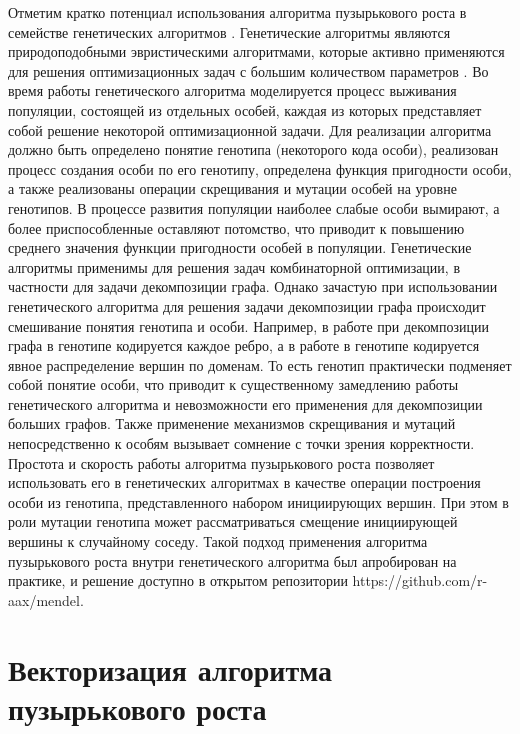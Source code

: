 \documentclass[
11pt,%
tightenlines,%
twoside,%
onecolumn,%
nofloats,%
nobibnotes,%
nofootinbib,%
superscriptaddress,%
noshowpacs,%
centertags]%
{revtex4}
\begin{document}
Отметим кратко потенциал использования алгоритма пузырькового роста в семействе генетических алгоритмов \cite{20Katosh}.
Генетические алгоритмы являются природоподобными эвристическими алгоритмами, которые активно применяются для решения оптимизационных задач с большим количеством параметров \cite{21Wirayanti}.
Во время работы генетического алгоритма моделируется процесс выживания популяции, состоящей из отдельных особей, каждая из которых представляет собой решение некоторой оптимизационной задачи.
Для реализации алгоритма должно быть определено понятие генотипа (некоторого кода особи), реализован процесс создания особи по его генотипу, определена функция пригодности особи, а также реализованы операции скрещивания и мутации особей на уровне генотипов.
В процессе развития популяции наиболее слабые особи вымирают, а более приспособленные оставляют потомство, что приводит к повышению среднего значения функции пригодности особей в популяции.
Генетические алгоритмы применимы для решения задач комбинаторной оптимизации, в частности для задачи декомпозиции графа.
Однако зачастую при использовании генетического алгоритма для решения задачи декомпозиции графа происходит смешивание понятия генотипа и особи.
Например, в работе \cite{22Chaouche} при декомпозиции графа в генотипе кодируется каждое ребро, а в работе \cite{23Li} в генотипе кодируется явное распределение вершин по доменам.
То есть генотип практически подменяет собой понятие особи, что приводит к существенному замедлению работы генетического алгоритма и невозможности его применения для декомпозиции больших графов.
Также применение механизмов скрещивания и мутаций непосредственно к особям вызывает сомнение с точки зрения корректности.
Простота и скорость работы алгоритма пузырькового роста позволяет использовать его в генетических алгоритмах в качестве операции построения особи из генотипа, представленного набором инициирующих вершин.
При этом в роли мутации генотипа может рассматриваться смещение инициирующей вершины к случайному соседу.
Такой подход применения алгоритма пузырькового роста внутри генетического алгоритма был апробирован на практике, и решение доступно в открытом репозитории https://github.com/r-aax/mendel.

\section{Векторизация алгоритма пузырькового роста}
\end{document}
